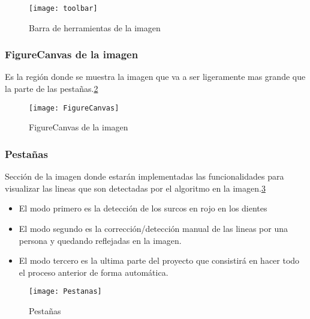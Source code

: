 \begin{figure}[h]
\centering
\texttt{[image: toolbar]}
\caption{Barra de herramientas de la imagen}\label{fig:5.11}
\end{figure}


\subsubsection{FigureCanvas de la imagen}
Es la región donde se muestra la imagen que va a ser ligeramente mas grande que la parte de las pestañas.\ref{fig:5.12}
\begin{figure}[h]
\centering
\texttt{[image: FigureCanvas]}
\caption{FigureCanvas de la imagen}
\label{fig:5.12}
\end{figure}


\subsubsection{Pestañas}
Sección de la imagen donde estarán implementadas las funcionalidades para visualizar las lineas que son detectadas por el algoritmo en la imagen.\ref{fig:5.13}
\begin{itemize}
\item El modo primero es la detección de los surcos en rojo en los dientes 
\item El modo segundo es la corrección/detección manual de las lineas por una persona y quedando reflejadas en la imagen.
\item El modo tercero es la ultima parte del proyecto que consistirá en hacer todo el proceso anterior de forma automática.
\end{itemize}

\begin{figure}[h]
\centering
\texttt{[image: Pestanas]}
\caption{Pestañas}
\label{fig:5.13}
\end{figure}



